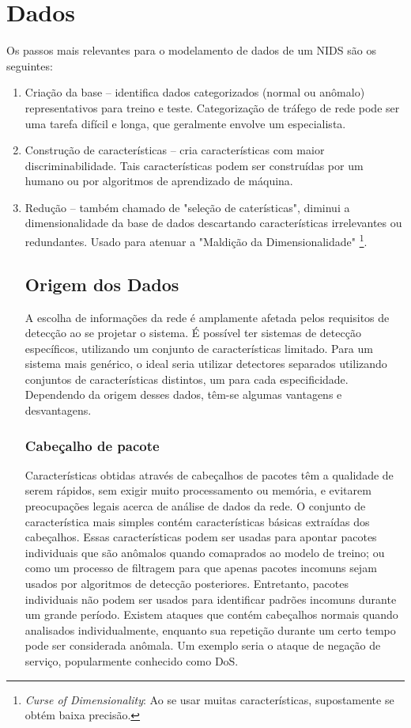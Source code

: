 \chapter{Dados}
\label{dados}
Os passos mais relevantes para o modelamento de dados de um NIDS são os seguintes:
\begin{enumerate}
    \item Criação da base -- identifica dados categorizados (normal ou anômalo) representativos para treino e teste.
    Categorização de tráfego de rede pode ser uma tarefa difícil e longa, que geralmente envolve um especialista.
    \item Construção de características -- cria características com maior discriminabilidade. Tais características
    podem ser construídas por um humano ou por algoritmos de aprendizado de máquina.
    \item Redução -- também chamado de "seleção de caterísticas", diminui a dimensionalidade da base de dados
    descartando características irrelevantes ou redundantes. Usado para atenuar a "Maldição da Dimensionalidade"
    \footnote{\textit{Curse of Dimensionality}: Ao se usar muitas características,
    supostamente se obtém baixa precisão.}.

\section{Origem dos Dados}
A escolha de informações da rede é amplamente afetada pelos requisitos de detecção ao se projetar o sistema.
É possível ter sistemas de detecção específicos, utilizando um conjunto de características limitado.
Para um sistema mais genérico, o ideal seria utilizar detectores separados utilizando conjuntos de características
distintos, um para cada especificidade. Dependendo da origem desses dados, têm-se algumas vantagens e desvantagens.

\subsection{Cabeçalho de pacote}
Características obtidas através de  cabeçalhos de pacotes têm a qualidade de serem rápidos, sem exigir muito
processamento ou memória, e evitarem preocupações legais acerca de análise de dados da rede.
O conjunto de característica mais simples contém características básicas extraídas dos cabeçalhos. Essas
características podem ser usadas para apontar pacotes individuais que são anômalos quando comaprados ao modelo de
treino; ou como um processo de filtragem para que apenas pacotes incomuns sejam usados por algoritmos de detecção
posteriores.
Entretanto, pacotes individuais não podem ser usados para identificar padrões incomuns durante um grande período.
Existem ataques que contém cabeçalhos normais quando analisados individualmente, enquanto sua repetição durante
um certo tempo pode ser considerada anômala. Um exemplo seria o ataque de negação de serviço, popularmente conhecido
como DoS.


\end{enumerate}

